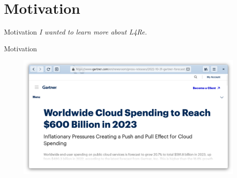 \section*{Motivation}
\label{sec:motivation}

\begin{frame}{Motivation}
  \pause
  \centering
  \emph{I wanted to learn more about L4Re.}
\end{frame}

\begin{frame}{Motivation}
  \vspace*{-0.5cm}
  \begin{figure}[t]
    \centering
    \includegraphics[keepaspectratio,scale=0.32]{figures/gartner-cloud-spending}
    \tiny\cite{gartner-cloud-spending}
  \end{figure}
\end{frame}

